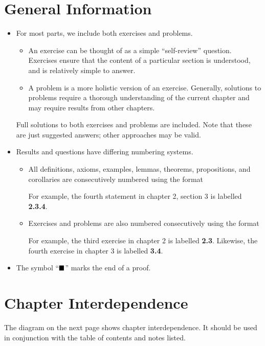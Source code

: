 \section*{General Information}
\begin{itemize}
    \item For most parts, we include both exercises and problems.
    \begin{itemize}
        \item An exercise can be thought of as a simple ``self-review'' question. Exercises ensure that the content of a particular section is understood, and is relatively simple to answer.
        \item A problem is a more holistic version of an exercise. Generally, solutions to problems require a thorough understanding of the current chapter and may require results from other chapters.        
    \end{itemize}
    Full solutions to both exercises and problems are included. Note that these are just suggested answers; other approaches may be valid.

    \item Results and questions have differing numbering systems.
    \begin{itemize}
        \item All definitions, axioms, examples, lemmas, theorems, propositions, and corollaries are consecutively numbered using the format
        \begin{quote}
        \end{quote}
        For example, the fourth statement in chapter 2, section 3 is labelled \textbf{2.3.4}.
        \item Exercises and problems are also numbered consecutively using the format
        \begin{quote}
        \end{quote}
        For example, the third exercise in chapter 2 is labelled \textbf{2.3}. Likewise, the fourth exercise in chapter 3 is labelled \textbf{3.4}.
    \end{itemize}
    \item The symbol ``$\blacksquare$'' marks the end of a proof.
\end{itemize}

\section*{Chapter Interdependence}
The diagram on the next page shows chapter interdependence. It should be used in conjunction with the table of contents and notes listed.

